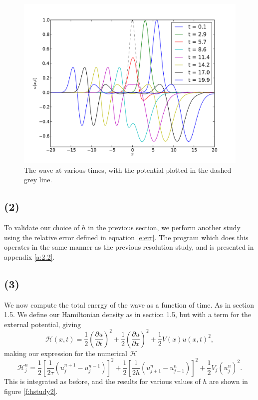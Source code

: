 \documentclass[10pt]{article}
\newcommand{\ujn}{u_{j}^{n}}
\newcommand{\ujpn}{u_{j+1}^{n}}
\newcommand{\ujmn}{u_{j-1}^{n}}
\newcommand{\ujnp}{u_{j}^{n+1}}
\newcommand{\ujnm}{u_{j}^{n-1}}
\begin{document}
\begin{figure}
  \centering
  \includegraphics[width=\textwidth]{2/cosh.pdf}
  \caption{The wave at various times, with the potential plotted in the dashed grey line.}
  \label{f:cosh}
\end{figure}



\clearpage
\subsection*{(2)}
To validate our choice of $h$ in the previous section, we perform another study using
the relative error defined in equation \ref{e:err}.
The program which does this operates in the same manner as the previous resolution study,
and is presented in appendix \ref{a:2.2}.

\clearpage
\subsection*{(3)}
We now compute the total energy of the wave as a function of time. As in section
1.5.
We define our Hamiltonian density as in section 1.5, but with
a term for the external potential, giving
\begin{equation}
\mathcal{H}(x,t) = \frac{1}{2}\left(\frac{\partial u}{\partial t}\right)^2
+\frac{1}{2}\left(\frac{\partial u}{\partial x}\right)^2 +\frac{1}{2}V(x)u(x,t)^2,
\label{e:ham}
\end{equation}
making our expression for the numerical $\mathcal{H}$
$$ \mathcal{H}_j^n = \frac{1}{2}\left[\frac{1}{2\tau}\left(\ujnp - \ujnm\right)\right]^2
+ \frac{1}{2}\left[ \frac{1}{2h} \left(\ujpn - \ujmn\right)\right]^2 +
\frac{1}{2}V_j\left(\ujn\right)^2.$$
This is integrated as before, and the results for various values of $h$ are shown in
figure \ref{f:hstudy2}.
\end{document}
